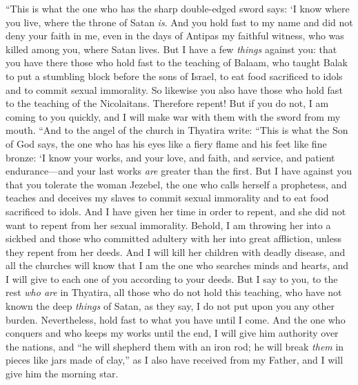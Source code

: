 \begin{biblechapter}
\verse “This is what the one who has the sharp double-edged sword says:
\verse ‘I know where you live, where the throne of Satan \textit{is}. And you hold fast to my name and did not deny your faith in me, even in the days of Antipas my faithful witness, who was killed among you, where Satan lives.
\verse But I have a few \textit{things} against you: that you have there those who hold fast to the teaching of Balaam, who taught Balak to put a stumbling block before the sons of Israel, to eat food sacrificed to idols and to commit sexual immorality.
\verse So likewise you also have those who hold fast to the teaching of the Nicolaitans.
\verse Therefore repent! But if you do not, I am coming to you quickly, and I will make war with them with the sword from my mouth.
 “And to the angel of the church in Thyatira write:
\verse “This is what the Son of God says, the one who has his eyes like a fiery flame and his feet like fine bronze:
\verse ‘I know your works, and your love, and faith, and service, and patient endurance—and your last works \textit{are} greater than the first.
\verse But I have against you that you tolerate the woman Jezebel, the one who calls herself a prophetess, and teaches and deceives my slaves to commit sexual immorality and to eat food sacrificed to idols.
\verse And I have given her time in order to repent, and she did not want to repent from her sexual immorality.
\verse Behold, I am throwing her into a sickbed and those who committed adultery with her into great affliction, unless they repent from her deeds.
\verse And I will kill her children with deadly disease, and all the churches will know that I am the one who searches minds and hearts, and I will give to each one of you according to your deeds.
\verse But I say to you, to the rest \textit{who are} in Thyatira, all those who do not hold this teaching, who have not known the deep \textit{things} of Satan, as they say, I do not put upon you any other burden.
\verse Nevertheless, hold fast to what you have until I come.
\verse And the one who conquers and who keeps my works until the end, I will give him authority over the nations,
\verse and “he will shepherd them with an iron rod; he will break \textit{them} in pieces like jars made of clay,”
\verse as I also have received from my Father, and I will give him the morning star.
\end{biblechapter}

